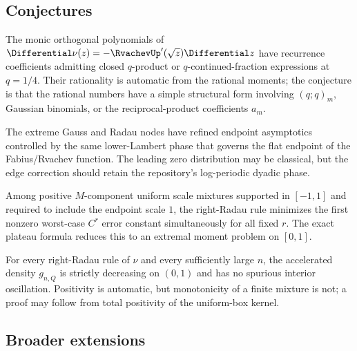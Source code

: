 \documentclass[11pt,oneside]{article}
\numberwithin{equation}{section}
\theoremstyle{definition}
\theoremstyle{remark}
\begin{document}
\subsection{Conjectures}

\begin{conjecture}
\label{p3:conj:q-orthogonal}
The monic orthogonal polynomials of
$\Differential\nu(z)=-\RvachevUp'(\sqrt z)\Differential z$ have recurrence coefficients admitting closed
$q$-product or $q$-continued-fraction expressions at $q=1/4$.  Their rationality is
automatic from the rational moments; the conjecture is that the rational numbers have a
simple structural form involving $(q;q)_m$, Gaussian binomials, or the reciprocal-product
coefficients $a_m$.
\end{conjecture}

\begin{conjecture}
\label{p3:conj:lambert-edge}
The extreme Gauss and Radau nodes have refined endpoint asymptotics controlled by the
same lower-Lambert phase that governs the flat endpoint of the Fabius/Rvachev function.
The leading zero distribution may be classical, but the edge correction should retain
the repository's log-periodic dyadic phase.
\end{conjecture}

\begin{conjecture}
\label{p3:conj:minimax}
Among positive $M$-component uniform scale mixtures supported in $[-1,1]$ and required
to include the endpoint scale $1$, the right-Radau rule minimizes the first nonzero
worst-case $C^r$ error constant simultaneously for all fixed $r$.  The exact plateau
formula reduces this to an extremal moment problem on $[0,1]$.
\end{conjecture}

\begin{conjecture}
For every right-Radau rule of $\nu$ and every sufficiently large $n$, the accelerated
density $g_{n,Q}$ is strictly decreasing on $(0,1)$ and has no spurious interior
oscillation.  Positivity is automatic, but monotonicity of a finite mixture is not; a
proof may follow from total positivity of the uniform-box kernel.
\end{conjecture}

\subsection{Broader extensions}
\end{document}

